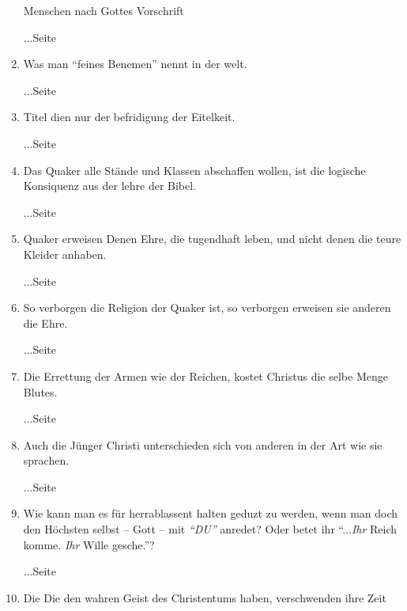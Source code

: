 \begin{enumerate}
Menschen nach Gottes Vorschrift
 \begin{flushright}...Seite \pageref{ref:09_20_koenig}\end{flushright}
 \item Was man "`feines Benemen"' nennt in der welt.
 \begin{flushright}...Seite \pageref{ref:09_26_feines_benemen}\end{flushright}
 \item Titel dien nur der befridigung der Eitelkeit.
 \begin{flushright}...Seite \pageref{ref:09_31_heuchelei}\end{flushright}
 \item Das Quaker alle Stände und Klassen abschaffen wollen, ist die logische
Konsiquenz aus der lehre der Bibel.
 \begin{flushright}...Seite
\pageref{ref:09_35_staende_abschaffen}\end{flushright}
 \item Quaker erweisen Denen Ehre, die tugendhaft leben, und nicht denen die
teure Kleider anhaben.
 \begin{flushright}...Seite \pageref{ref:09_36_ehre_erweisen}\end{flushright}
 \item So verborgen die Religion der Quaker ist, so verborgen erweisen sie
anderen die Ehre.
 \begin{flushright}...Seite \pageref{ref:09_37_ehre_erweisen}\end{flushright}
 \item Die Errettung der Armen wie der Reichen, kostet Christus die selbe Menge
Blutes.
 \begin{flushright}...Seite \pageref{ref:09_39_erettung}\end{flushright}
 \item Auch die Jünger Christi unterschieden sich von anderen in der Art wie sie
sprachen.
 \begin{flushright}...Seite \pageref{ref:10_08_sprache}\end{flushright}
 \item Wie kann man es für herrablassent halten geduzt zu werden, wenn man doch
den Höchsten selbst -- Gott -- mit \textit{"`DU"'} anredet? Oder betet ihr
"`...\textit{Ihr} Reich komme. \textit{Ihr} Wille gesche."'?
 \begin{flushright}...Seite \pageref{ref:10_08_duzen}\end{flushright}
 \item Die Die den wahren Geist des Christentums haben, verschwenden ihre Zeit

\end{enumerate}
